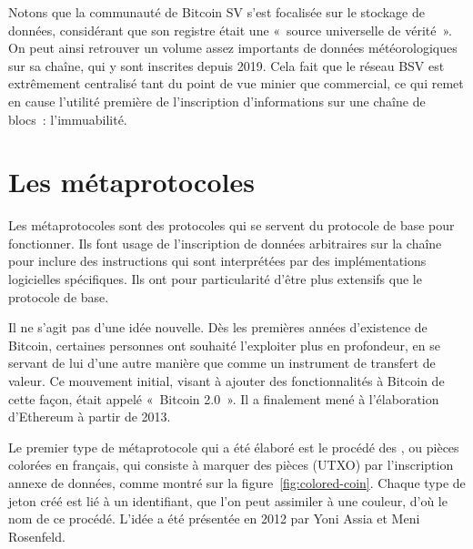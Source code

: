 Notons que la communauté de Bitcoin SV s'est focalisée sur le stockage de données, considérant que son registre était une «~source universelle de vérité~». On peut ainsi retrouver un volume assez importants de données météorologiques sur sa chaîne, qui y sont inscrites depuis 2019. Cela fait que le réseau BSV est extrêmement centralisé tant du point de vue minier que commercial, ce qui remet en cause l'utilité première de l'inscription d'informations sur une chaîne de blocs~: l'immuabilité.

\section*{Les métaprotocoles}

Les métaprotocoles sont des protocoles qui se servent du protocole de base pour fonctionner. Ils font usage de l'inscription de données arbitraires sur la chaîne pour inclure des instructions qui sont interprétées par des implémentations logicielles spécifiques. Ils ont pour particularité d'être plus extensifs que le protocole de base.

Il ne s'agit pas d'une idée nouvelle. Dès les premières années d'existence de Bitcoin, certaines personnes ont souhaité l'exploiter plus en profondeur, en se servant de lui d'une autre manière que comme un instrument de transfert de valeur. Ce mouvement initial, visant à ajouter des fonctionnalités à Bitcoin de cette façon, était appelé «~Bitcoin 2.0~». Il a finalement mené à l'élaboration d'Ethereum à partir de 2013.

Le premier type de métaprotocole qui a été élaboré est le procédé des , ou pièces colorées en français, qui consiste à marquer des pièces (UTXO) par l'inscription annexe de données, comme montré sur la figure~\ref{fig:colored-coin}. Chaque type de jeton créé est lié à un identifiant, que l'on peut assimiler à une couleur, d'où le nom de ce procédé. L'idée a été présentée en 2012 par Yoni Assia et Meni Rosenfeld. %

